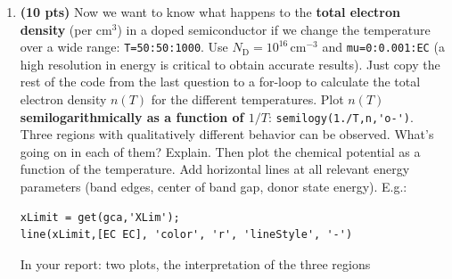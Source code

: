 \documentclass[11pt]{article}
\begin{document}
\begin{enumerate}[resume]
\item \textbf{(10 pts)} Now we want to know what happens to the {\bf total electron density} (per  $\mathrm{cm^3}$) in a doped semiconductor if we change the temperature over a wide range: \verb|T=50:50:1000|. Use $N_\text{D}=10^{16}\,\mathrm{cm^{-3}}$ and \verb|mu=0:0.001:EC| (a high resolution in energy is critical to obtain accurate results). Just copy the rest of the code from the last question to a for-loop to calculate the total electron density $n(T)$ for the different temperatures. Plot $n(T)$ {\bf semilogarithmically as a function of $1/T$}: \verb|semilogy(1./T,n,'o-')|. Three regions with qualitatively different behavior can be observed. What's going on in each of them? Explain. Then plot the chemical potential as a function of the temperature. Add horizontal lines at all relevant energy parameters (band edges, center of band gap, donor state energy). E.g.:
\begin{verbatim}
xLimit = get(gca,'XLim');
line(xLimit,[EC EC], 'color', 'r', 'lineStyle', '-')
\end{verbatim}
{\color{red}In your report: two plots, the interpretation of the three regions}

\end{enumerate}
\end{document}
